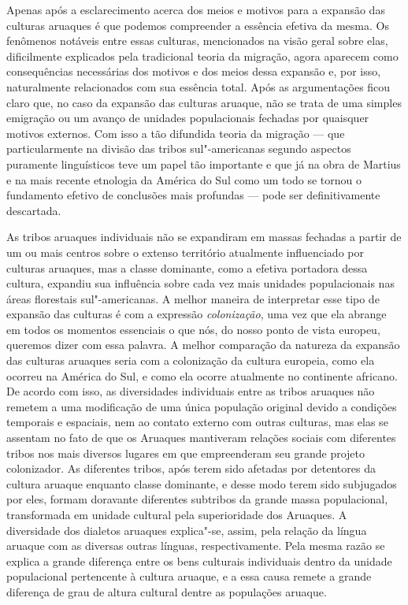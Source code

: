 Apenas após a esclarecimento acerca dos meios e motivos para a expansão das culturas aruaques
é que podemos compreender a essência efetiva da mesma. 
Os fenômenos notáveis entre essas culturas,
mencionados na visão geral sobre elas, dificilmente explicados pela tradicional 
teoria da migração, agora aparecem como
consequências necessárias dos motivos e dos meios dessa expansão e, por
isso, naturalmente relacionados com sua essência total. Após as
argumentações ficou claro que, no caso da expansão das culturas
aruaque, não se trata de uma simples emigração ou um avanço de unidades
populacionais fechadas por quaisquer motivos externos. Com isso a tão
difundida teoria da migração --- que particularmente na divisão das
tribos sul"-americanas segundo aspectos puramente linguísticos teve um
papel tão importante e que já na obra de Martius e na mais recente
etnologia da América do Sul como um todo se tornou o fundamento efetivo
de conclusões mais profundas --- pode ser definitivamente descartada. 

As tribos aruaques individuais não se
expandiram em massas fechadas a partir de um ou mais centros sobre o
extenso território atualmente influenciado por culturas aruaques, mas a
classe dominante, como a efetiva portadora dessa cultura, expandiu sua
influência sobre cada vez mais unidades populacionais nas áreas
florestais sul"-americanas. A melhor maneira de interpretar esse tipo de
expansão das culturas é com a expressão \textit{colonização}, uma vez que
ela abrange em todos os momentos essenciais o que nós, do nosso ponto de
vista europeu, queremos dizer com essa palavra. A melhor comparação da
natureza da expansão das culturas aruaques seria com a colonização da
cultura europeia, como ela ocorreu na América do Sul, e como ela ocorre
atualmente no continente africano. De acordo com isso, as diversidades
individuais entre as tribos aruaques não remetem a uma modificação de uma
única população original devido a condições temporais e espaciais, nem
ao contato externo com outras culturas, mas elas se assentam no fato de
que os Aruaques mantiveram relações sociais com diferentes tribos nos
mais diversos lugares em que empreenderam seu grande projeto
colonizador. As diferentes tribos, após terem sido afetadas por
detentores da cultura aruaque enquanto classe dominante, e desse modo
terem sido subjugados por eles, formam doravante diferentes subtribos da
grande massa populacional, transformada em unidade cultural pela
superioridade dos Aruaques. A diversidade dos dialetos aruaques
explica"-se, assim, pela relação da língua aruaque com as diversas outras
línguas, respectivamente. Pela mesma razão se explica a grande diferença
entre os bens culturais individuais dentro da unidade populacional
pertencente à cultura aruaque, e a essa causa remete a grande diferença
de grau de altura cultural dentre as populações aruaque.

